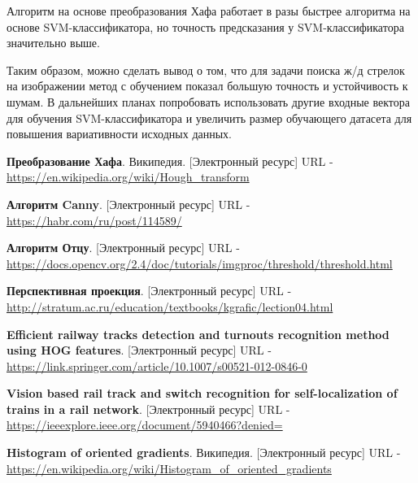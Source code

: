 Алгоритм на основе преобразования Хафа работает в разы быстрее алгоритма на основе SVM-классификатора, но точность предсказания у SVM-классификатора значительно выше.

Таким образом, можно сделать вывод о том, что для задачи поиска ж/д стрелок на изображении метод с обучением показал большую точность и устойчивость к шумам. В дальнейших планах попробовать использовать другие входные вектора для обучения SVM-классификатора и увеличить размер обучающего датасета для повышения вариативности исходных данных.

\newpage
\begin{thebibliography}{2}
	\textbf{Преобразование Хафа}. Википедия. [Электронный ресурс] URL - 
	\href{https://en.wikipedia.org/wiki/Hough\_transform}{https://en.wikipedia.org/wiki/Hough\_transform}
	
	\textbf{Алгоритм Canny}. [Электронный ресурс] URL - 
	\href{https://habr.com/ru/post/114589/}{https://habr.com/ru/post/114589/}
	
	\textbf{Алгоритм Отцу}. [Электронный ресурс] URL - 
	\href{https://docs.opencv.org/2.4/doc/tutorials/imgproc/threshold/threshold.html}{https://docs.opencv.org/2.4/doc/tutorials/imgproc/threshold/threshold.html}
	
	\textbf{Перспективная проекция}. [Электронный ресурс] URL - 
	\href{http://stratum.ac.ru/education/textbooks/kgrafic/lection04.html}{http://stratum.ac.ru/education/textbooks/kgrafic/lection04.html}
	
	\textbf{Efficient railway tracks detection and turnouts recognition method using HOG features}. [Электронный ресурс] URL - 
	\href{https://link.springer.com/article/10.1007/s00521-012-0846-0}{https://link.springer.com/article/10.1007/s00521-012-0846-0}
	
	\textbf{Vision based rail track and switch recognition for self-localization of trains in a rail network}. [Электронный ресурс] URL - 
	\href{https://ieeexplore.ieee.org/document/5940466?denied=}{https://ieeexplore.ieee.org/document/5940466?denied=}
	
	\textbf{Histogram of oriented gradients}. Википедия. [Электронный ресурс] URL - 
	\href{https://en.wikipedia.org/wiki/Histogram_of_oriented_gradients}{https://en.wikipedia.org/wiki/Histogram\_of\_oriented\_gradients}
	

\end{thebibliography}
